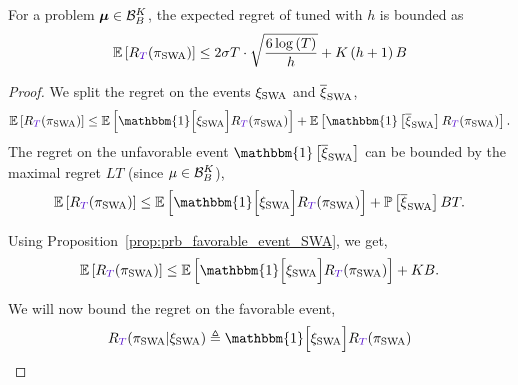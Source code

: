 \begin{proposition}
 For a problem ${\boldsymbol \mu} \in \mathcal{B}_{B}^K$, the expected regret of \SWA tuned with $h$ is bounded as
 \[
\EE{ \regret(\piSWA)} \leq 2\sigma T\cdot\sqrt{\frac{6\log\pa{T}}{h}} + K\pa{h+1}B
 \]
\end{proposition}

\begin{proof}
We split the regret on the events $\xi_{\rm SWA}$ and $\overline{\xi}_{\rm SWA}$, 
\[
\EE{\regret(\piSWA)} \leq \EE{\mathbbm{1} \Big[\HPevent_{\rm SWA}\Big] \regret(\piSWA)} + \EE{\mathbbm{1} \left[\bar{\HPevent}_{\rm SWA}\right] \regret(\piSWA)}.
\]
The regret on the unfavorable event $\mathbbm{1} \left[\bar{\HPevent}_{\rm SWA}\right]$ can be bounded by the maximal regret $LT$ (since $\mu \in \mathcal{B}_{B}^K$), 
\[
\EE{\regret(\piSWA)} \leq  \EE{\mathbbm{1} \Big[\HPevent_{\rm SWA}\Big] \regret(\piSWA)} + \PP{\bar{\HPevent}_{\rm SWA}} BT.
\]

Using Proposition~\ref{prop:prb_favorable_event_SWA}, we get,
\begin{equation}
\label{eq:regret-unfav-event-SWA}
\EE{\regret(\piSWA)} \leq  \EE{\mathbbm{1} \Big[\HPevent_{\rm SWA}\Big]  \regret(\piSWA)} + KB.
\end{equation}


We will now bound the regret on the favorable event,
\[
\regret(\piSWA | \HPevent_{\rm SWA}) \triangleq \mathbbm{1} \Big[\HPevent_{\rm SWA}\Big]  \regret(\piSWA)
\]


\end{proof}
